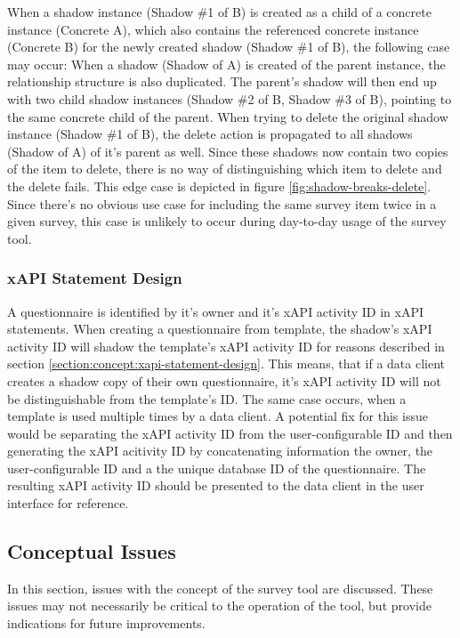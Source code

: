     		When a shadow instance (Shadow \#1 of B) is created as a child of a concrete instance (Concrete A), which also contains the referenced
    		concrete instance (Concrete B) for the newly created shadow (Shadow \#1 of B), the following case may occur: When a shadow (Shadow of A) is created
    		of the parent instance, the relationship structure is also duplicated. The parent's shadow will
    		then end up with two child shadow instances (Shadow \#2 of B, Shadow \#3 of B), pointing to the same concrete child of the parent.
    		When trying to delete the original shadow instance (Shadow \#1 of B), the delete action is propagated to all
    		shadows (Shadow of A) of it's parent as well. Since these shadows now contain two copies of the
    		item to delete, there is no way of distinguishing which item to delete and the delete fails.
    		This edge case is depicted in figure \ref{fig:shadow-breaks-delete}.
    		Since there's no obvious use case for including the same survey item twice in a given survey,
    		this case is unlikely to occur during day-to-day usage of the survey tool.

    	\subsubsection{xAPI Statement Design}
    		A questionnaire is identified by it's owner and it's xAPI activity ID in xAPI statements.
    		When creating a questionnaire from template, the shadow's xAPI activity ID will shadow
    		the template's xAPI activity ID for reasons described in section \ref{section:concept:xapi-statement-design}.
    		This means, that if a data client creates a shadow copy of their own
    		questionnaire, it's xAPI activity ID will not be distinguishable from
    		the template's ID. The same case occurs, when a template is used multiple times
    		by a data client. A potential fix for this issue would be
    		separating the xAPI activity ID from the user-configurable ID and
    		then generating the xAPI acitivity ID by concatenating information
    		the owner, the user-configurable ID and a the unique database ID
    		of the questionnaire. The resulting xAPI activity ID should be presented to the data client
    		in the user interface for reference.

    \subsection{Conceptual Issues}
    	In this section, issues with the concept of the survey tool are discussed.
    	These issues may not necessarily be critical to the operation of the tool,
    	but provide indications for future improvements.

